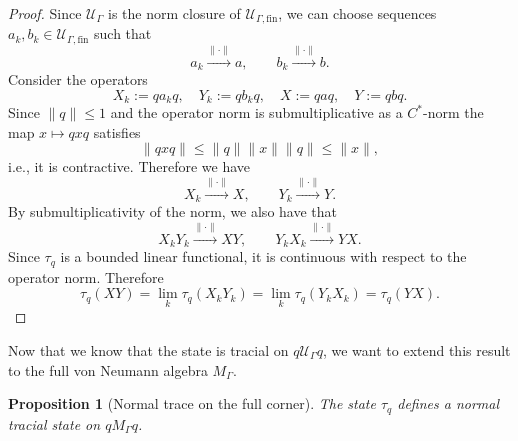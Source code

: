 \documentclass[aps,pra,reprint,superscriptaddress]{revtex4-2}
\newcommand{\cU}{{\mathcal U}}
\newcommand\G{\Gamma}
\providecommand{\norm}[1]{\lVert #1\rVert}
\newtheorem{proposition}[theorem]{Proposition}
\theoremstyle{definition}
\theoremstyle{remark}
\begin{document}
\begin{proof}
Since $\cU_\G$ is the norm closure of $\cU_{\G,\mathrm{fin}}$, we can choose sequences $a_k,b_k\in\cU_{\G,\mathrm{fin}}$ such that
\begin{equation}
  a_k \xrightarrow{\norm{\cdot}} a,
  \qquad
  b_k \xrightarrow{\norm{\cdot}} b.
\end{equation}
Consider the operators
\begin{equation}
  X_k:=qa_kq,
  \quad
  Y_k:=qb_kq,
  \quad
  X:=qaq,
  \quad
  Y:=qbq.
\end{equation}
Since $\norm{q} \leq 1$ and the operator norm is submultiplicative as a
$C^\ast$-norm
\cite[II.1.1.1]{Blackadar} the map $x \mapsto q x q$ satisfies
\begin{equation}
    \norm{q x q} \leq \norm{q} \norm{x} \norm{q} \leq \norm{x},
\end{equation}
i.e., it is contractive. Therefore we have 
\begin{equation}
  X_k \xrightarrow{\norm{\cdot}} X,
  \qquad
  Y_k \xrightarrow{\norm{\cdot}} Y.
\end{equation}
By submultiplicativity of the norm, we also have that 
\begin{equation}
    X_kY_k \xrightarrow{\norm{\cdot}} XY,
    \qquad
    Y_kX_k \xrightarrow{\norm{\cdot}} YX.
\end{equation}
Since $\tau_q$ is a bounded linear functional, it is continuous with respect to the operator
norm. Therefore
\begin{equation}
  \tau_q(XY)
  =\lim_k\tau_q(X_kY_k)
  =\lim_k\tau_q(Y_kX_k)
  =\tau_q(YX).
\end{equation}
\end{proof}
Now that we know that the state is tracial on $q \cU_\G q$, we want to extend this result to the full von Neumann
algebra $M_\G$.
\begin{proposition}[Normal trace on the full corner]\label{prop:normal-trace}
The state $\tau_q$ defines a normal tracial state on $q M_\G q$.
\end{proposition}
\end{document}
